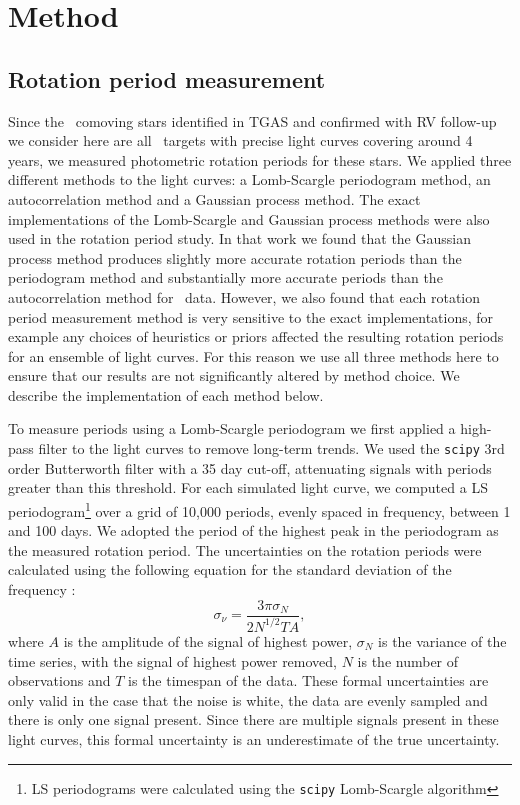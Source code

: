 \newcommand{\dantodo}[1]{{\color{blue}#1}}

\section{Method}
\label{sec:method}

\subsection{Rotation period measurement}

Since the \nconfirmed\ comoving stars identified in TGAS and confirmed with RV
follow-up we consider here are all \Kepler\ targets with precise light curves
covering around 4 years, we measured photometric rotation periods for these
stars.
We applied three different methods to the light curves: a Lomb-Scargle
periodogram method, an autocorrelation method and a Gaussian process method.
The exact implementations of the Lomb-Scargle and Gaussian process methods
were also used in the \citet{Angus2017} rotation period study.
In that work we found that the Gaussian process method produces slightly more
accurate rotation periods than the periodogram method and substantially more
accurate periods than the autocorrelation method for \kepler\ data.
However, we also found that each rotation period measurement method is very
sensitive to the exact implementations, for example any choices of heuristics
or priors affected the resulting rotation periods for an ensemble of light
curves.
For this reason we use all three methods here to ensure that our results are
not significantly altered by method choice.
We describe the implementation of each method below.

To measure periods using a Lomb-Scargle periodogram we first applied a
high-pass filter to the light curves to remove long-term trends.
We used the {\tt scipy} 3rd order Butterworth filter with a 35 day cut-off,
attenuating signals with periods greater than this threshold.
For each simulated light curve, we computed a LS periodogram\footnote{LS
periodograms were calculated using the {\tt scipy} Lomb-Scargle algorithm}
over a grid of 10,000 periods, evenly spaced in frequency, between 1 and 100
days.
We adopted the period of the highest peak in the periodogram as the measured
rotation period.
The uncertainties on the rotation periods were calculated using the
following equation for the standard deviation of the frequency
\citep{Horne1986, Kovacs1981}:
\begin{equation}
    \sigma_{\nu} = \frac{3\pi\sigma_N}{2N^{1/2}TA},
\end{equation}
where $A$ is the amplitude of the signal of highest power, $\sigma_N$ is the
variance of the time series, with the signal of highest power removed, $N$
is the number of observations and $T$ is the timespan of the data.
These formal uncertainties are only valid in the case that the noise is white,
the data are evenly sampled and there is only one signal present.
Since there are multiple signals present in these light curves, this formal
uncertainty is an underestimate of the true uncertainty.

